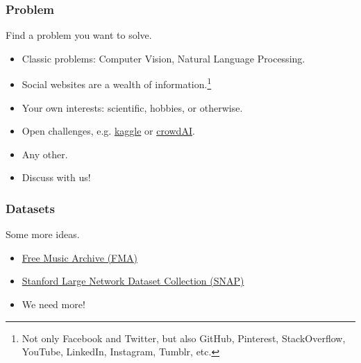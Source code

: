 \documentclass{beamer}
\newcommand{\todo}[1]{{\color{red} #1}}
\begin{document}

\begin{frame}
	\frametitle{Problem}
	\begin{center}
		Find a problem you want to solve.
	\end{center}
	\vfill
	\begin{itemize}
		\item Classic problems: Computer Vision, Natural Language Processing.
		\vfill
		\item Social websites are a wealth of information.\footnote{Not only
			Facebook and Twitter, but also GitHub, Pinterest, StackOverflow,
			YouTube, LinkedIn, Instagram, Tumblr, etc.}
		\vfill
		\item Your own interests: scientific, hobbies, or otherwise.
		\vfill
		\item Open challenges, e.g. \href{https://www.kaggle.com/}{kaggle} or \href{https://www.crowdai.org/}{crowdAI}.
		\vfill
		\item Any other.
		\vfill
		\item Discuss with us!
	\end{itemize}
\end{frame}


\begin{frame}
	\frametitle{Datasets}
	\begin{center}
		Some more ideas.
	\end{center}
	\vfill
	\begin{itemize}
		\item \href{https://github.com/mdeff/fma}{Free Music Archive (FMA)}
		\item \href{http://snap.stanford.edu/data/index.html}{Stanford Large Network Dataset Collection (SNAP)}
		\item \todo{We need more!}
	\end{itemize}
\end{frame}

\end{document}
